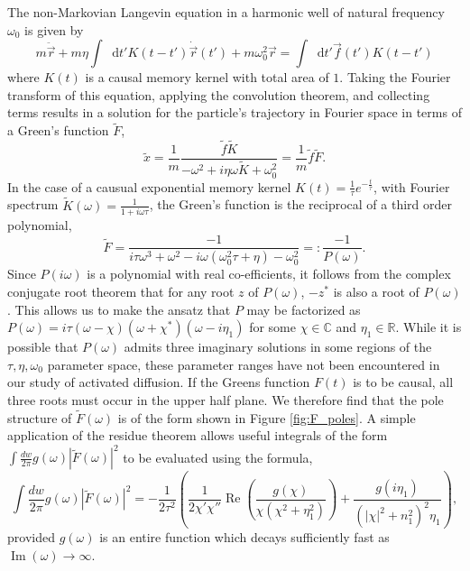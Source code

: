 \documentclass[7pt]{article}
\newcommand*{\diff}{\mathop{}\!\mathrm{d}}
\begin{document}
The non-Markovian Langevin equation in a harmonic well of natural frequency $\omega_0$ is given by
$$
m\ddot{\vec{r}}+m\eta\int\diff{t'}K(t-t')\dot{\vec{r}}(t')+m\omega_0^2\vec{r}=\int\diff{t'}\vec{f}(t')K(t-t')
$$
where $K(t)$ is a causal memory kernel with total area of $1$. Taking the Fourier transform of this equation, applying the convolution theorem, and collecting terms results in a solution for the particle's trajectory in Fourier space in terms of a Green's function $\tilde{F}$,
$$
\tilde{x} = \frac{1}{m} \frac{\tilde{f} \tilde{K}}{-\omega^2 + i \eta \omega \tilde{K} + \omega_0^2} = \frac{1}{m} \tilde{f} \tilde{F}. \label{eq:greens_function}
$$
In the case of a causual exponential memory kernel $K(t)=\frac{1}{\tau}e^{-\frac{t}{\tau}}$, with Fourier spectrum $\tilde{K}(\omega)=\frac{1}{1+i\omega\tau}$, the Green's function is the reciprocal of a third order polynomial,
$$
\tilde{F} = \frac{-1}{i\tau\omega^3 + \omega^2 - i\omega(\omega_0^2\tau + \eta) - \omega_0^2} =: \frac{-1}{P(\omega)}.
$$
Since $P(i\omega)$ is a polynomial with real co-efficients, it follows from the complex conjugate root theorem that for any root $z$ of $P(\omega)$, $-z^*$ is also a root of $P(\omega)$. This allows us to make the ansatz that $P$ may be factorized as $P(\omega) = i\tau\left(\omega - \chi\right)\left(\omega + \chi^*\right)\left(\omega - i\eta_1\right)$ for some $\chi\in\mathbb{C}$ and ${\eta_1\in\mathbb{R}}$. While it is possible that $P(\omega)$ admits three imaginary solutions in some regions of the $\tau,\eta,\omega_0$ parameter space, these parameter ranges have not been encountered in our study of activated diffusion. If the Greens function $F(t)$ is to be causal, all three roots must occur in the upper half plane. We therefore find that the pole structure of $\tilde{F}(\omega)$ is of the form shown in Figure \ref{fig:F_poles}. A simple application of the residue theorem allows useful integrals of the form $\int\frac{dw}{2\pi} g\left(\omega\right) \left|\tilde{F}\left(\omega\right)\right|^2$ to be evaluated using the formula,
\begin{equation}
	\int\frac{dw}{2\pi} g\left(\omega\right) \left|\tilde{F}\left(\omega\right)\right|^2 =  -\frac{1}{2 \tau^{2}}\left(\frac{1}{2 \chi' \chi''} \operatorname{Re}\left(\frac{g(\chi)}{\chi\left(\chi^{2}+\eta_{1}^{2}\right)}\right)+\frac{g(i\eta_{1})}{\left(|\chi|^{2}+n_{1}^{2}\right)^{2} \eta_{1}}\right), \label{eq:integral_over_CF}
\end{equation}
provided $g(\omega)$ is an entire function which decays sufficiently fast as $\operatorname{Im}({\omega})\rightarrow\infty$.
\end{document}
